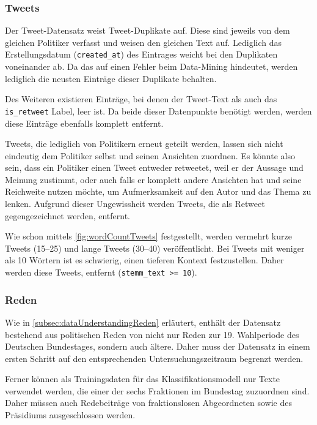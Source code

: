 \subsubsection*{Tweets} \label{subsubsec:filteringTweets}

Der Tweet-Datensatz \textcite{saltzer_finding_2022} weist Tweet-Duplikate auf. Diese sind jeweils von dem gleichen Politiker verfasst und weisen den gleichen Text auf. Lediglich das Erstellungsdatum (\texttt{created\_at}) des Eintrages weicht bei den Duplikaten voneinander ab. Da das auf einen Fehler beim Data-Mining hindeutet, werden lediglich die neusten Einträge dieser Duplikate behalten.

Des Weiteren existieren Einträge, bei denen der Tweet-Text als auch das \texttt{is\_retweet} Label, leer ist. Da beide dieser Datenpunkte benötigt werden, werden diese Einträge ebenfalls komplett entfernt. 

Tweets, die lediglich von Politikern erneut geteilt werden, lassen sich nicht eindeutig dem Politiker selbst und seinen Ansichten zuordnen. Es könnte also sein, dass ein Politiker einen Tweet entweder retweetet, weil er der Aussage und Meinung zustimmt, oder auch falls er komplett andere Ansichten hat und seine Reichweite nutzen möchte, um Aufmerksamkeit auf den Autor und das Thema zu lenken. Aufgrund dieser Ungewissheit werden Tweets, die als Retweet gegengezeichnet werden, entfernt.

Wie schon mittels \autoref{fig:wordCountTweets} festgestellt, werden vermehrt kurze Tweets (\numrange{15}{25}) und lange Tweets (\numrange{30}{40}) veröffentlicht. Bei Tweets mit weniger als \num{10} Wörtern ist es schwierig, einen tieferen Kontext festzustellen. Daher werden diese Tweets, entfernt (\texttt{stemm\_text >= 10}).

\subsubsection*{Reden}

Wie in \autoref{subsec:dataUnderstandingReden} erläutert, enthält der Datensatz bestehend aus politischen Reden von \citeauthor{richter_open_2021} nicht nur Reden zur 19. Wahlperiode des Deutschen Bundestages, sondern auch ältere. Daher muss der Datensatz in einem ersten Schritt auf den entsprechenden Untersuchungszeitraum begrenzt werden.

Ferner können als Trainingsdaten für das Klassifikationsmodell nur Texte verwendet werden, die einer der sechs Fraktionen im Bundestag zuzuordnen sind. Daher müssen auch Redebeiträge von fraktionslosen Abgeordneten sowie des Präsidiums ausgeschlossen werden.

